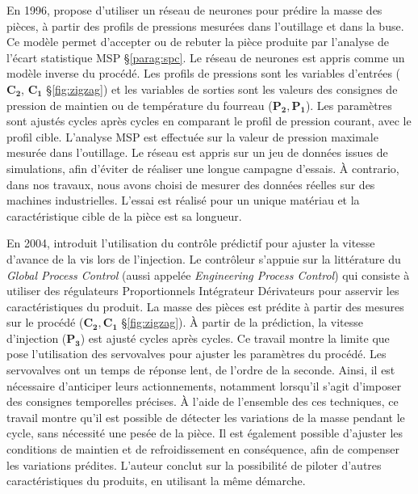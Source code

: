 En 1996, \cite{woll_online_1996} propose d'utiliser un réseau de neurones pour prédire la masse des pièces, à partir des profils de pressions mesurées dans l'outillage et dans la buse.
Ce modèle permet d'accepter ou de rebuter la pièce produite par l'analyse de l'écart statistique MSP §\ref{parag:spc}.
Le réseau de neurones est appris comme un modèle inverse du procédé.
Les profils de pressions sont les variables d'entrées ($\boldsymbol{C_2}$, $\boldsymbol{C_1}$ §\ref{fig:zigzag}) et les variables de sorties sont les valeurs des consignes de pression de maintien ou de température du fourreau ($\boldsymbol{P_2, P_1}$).
Les paramètres sont ajustés cycles après cycles en comparant le profil de pression courant, avec le profil cible.
L'analyse MSP est effectuée sur la valeur de pression maximale mesurée dans l'outillage.
Le réseau est appris sur un jeu de données issues de simulations, afin d'éviter de réaliser une longue campagne d'essais.
À contrario, dans nos travaux, nous avons choisi de mesurer des données réelles sur des machines industrielles.
L'essai est réalisé pour un unique matériau et la caractéristique cible de la pièce est sa longueur.

En 2004, \cite{yang_injection_2004} introduit l'utilisation du contrôle prédictif pour ajuster la vitesse d'avance de la vis lors de l'injection.
Le contrôleur s'appuie sur la littérature du \textit{Global Process Control} (aussi appelée \textit{Engineering Process Control}) qui consiste à utiliser des régulateurs Proportionnels Intégrateur Dérivateurs pour asservir les caractéristiques du produit.
La masse des pièces est prédite à partir des mesures sur le procédé ($\boldsymbol{C_2, C_1}$ §\ref{fig:zigzag}).
À partir de la prédiction, la vitesse d'injection ($\boldsymbol{P_3}$) est ajusté cycles après cycles.
Ce travail montre la limite que pose l'utilisation des servovalves pour ajuster les paramètres du procédé.
Les servovalves ont un temps de réponse lent, de l'ordre de la seconde.
Ainsi, il est nécessaire d'anticiper leurs actionnements, notamment lorsqu'il s'agit d'imposer des consignes temporelles précises.
À l'aide de l'ensemble des ces techniques, ce travail montre qu'il est possible de détecter les variations de la masse pendant le cycle, sans nécessité une pesée de la pièce.
Il est également possible d'ajuster les conditions de maintien et de refroidissement en conséquence, afin de compenser les variations prédites.
L'auteur conclut sur la possibilité de piloter d'autres caractéristiques du produits, en utilisant la même démarche.

